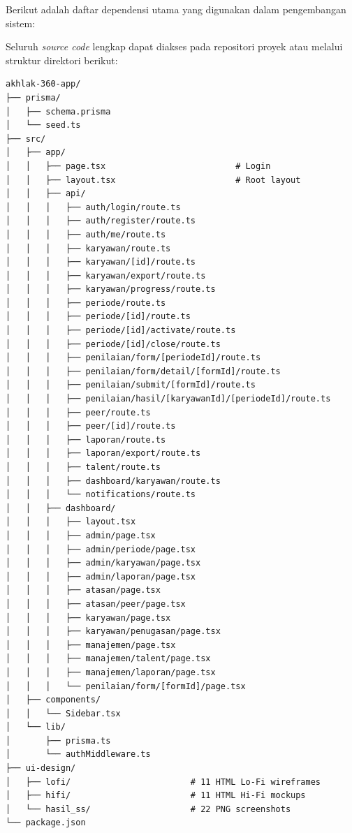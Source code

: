\documentclass[12pt,a4paper,oneside]{report}
\begin{document}
Berikut adalah daftar dependensi utama yang digunakan dalam pengembangan sistem:



Seluruh \textit{source code} lengkap dapat diakses pada repositori proyek atau melalui struktur direktori berikut:

\begin{verbatim}
akhlak-360-app/
├── prisma/
│   ├── schema.prisma
│   └── seed.ts
├── src/
│   ├── app/
│   │   ├── page.tsx                          # Login
│   │   ├── layout.tsx                        # Root layout
│   │   ├── api/
│   │   │   ├── auth/login/route.ts
│   │   │   ├── auth/register/route.ts
│   │   │   ├── auth/me/route.ts
│   │   │   ├── karyawan/route.ts
│   │   │   ├── karyawan/[id]/route.ts
│   │   │   ├── karyawan/export/route.ts
│   │   │   ├── karyawan/progress/route.ts
│   │   │   ├── periode/route.ts
│   │   │   ├── periode/[id]/route.ts
│   │   │   ├── periode/[id]/activate/route.ts
│   │   │   ├── periode/[id]/close/route.ts
│   │   │   ├── penilaian/form/[periodeId]/route.ts
│   │   │   ├── penilaian/form/detail/[formId]/route.ts
│   │   │   ├── penilaian/submit/[formId]/route.ts
│   │   │   ├── penilaian/hasil/[karyawanId]/[periodeId]/route.ts
│   │   │   ├── peer/route.ts
│   │   │   ├── peer/[id]/route.ts
│   │   │   ├── laporan/route.ts
│   │   │   ├── laporan/export/route.ts
│   │   │   ├── talent/route.ts
│   │   │   ├── dashboard/karyawan/route.ts
│   │   │   └── notifications/route.ts
│   │   ├── dashboard/
│   │   │   ├── layout.tsx
│   │   │   ├── admin/page.tsx
│   │   │   ├── admin/periode/page.tsx
│   │   │   ├── admin/karyawan/page.tsx
│   │   │   ├── admin/laporan/page.tsx
│   │   │   ├── atasan/page.tsx
│   │   │   ├── atasan/peer/page.tsx
│   │   │   ├── karyawan/page.tsx
│   │   │   ├── karyawan/penugasan/page.tsx
│   │   │   ├── manajemen/page.tsx
│   │   │   ├── manajemen/talent/page.tsx
│   │   │   ├── manajemen/laporan/page.tsx
│   │   │   └── penilaian/form/[formId]/page.tsx
│   ├── components/
│   │   └── Sidebar.tsx
│   └── lib/
│       ├── prisma.ts
│       └── authMiddleware.ts
├── ui-design/
│   ├── lofi/                        # 11 HTML Lo-Fi wireframes
│   ├── hifi/                        # 11 HTML Hi-Fi mockups
│   └── hasil_ss/                    # 22 PNG screenshots
└── package.json
\end{verbatim}

\end{document}
